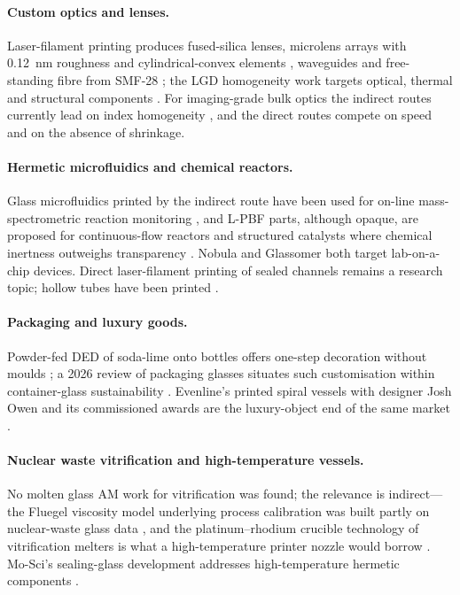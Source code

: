\paragraph{Custom optics and lenses.} Laser-filament printing produces fused-silica lenses, microlens arrays with \SI{0.12}{nm} roughness and cylindrical-convex elements \citep{kth2024microlens,luo2018quartz}, waveguides and free-standing fibre from SMF-28 \citep{hostetler2018sff}; the LGD homogeneity work targets optical, thermal and structural components \citep{lgd2024homog,grotesk2022}. For imaging-grade bulk optics the indirect routes currently lead on index homogeneity \citep{destino2018}, and the direct routes compete on speed and on the absence of shrinkage.

\paragraph{Hermetic microfluidics and chemical reactors.} Glass microfluidics printed by the indirect route have been used for on-line mass-spectrometric reaction monitoring \citep{microfluidics2019}, and L-PBF parts, although opaque, are proposed for continuous-flow reactors and structured catalysts where chemical inertness outweighs transparency \citep{datsiou2021}. Nobula and Glassomer both target lab-on-a-chip devices. Direct laser-filament printing of sealed channels remains a research topic; hollow tubes have been printed \citep{dgf2023tubes}.

\paragraph{Packaging and luxury goods.} Powder-fed DED of soda-lime onto bottles offers one-step decoration without moulds \citep{spirrett2023}; a 2026 review of packaging glasses situates such customisation within container-glass sustainability \citep{packaging2026}. Evenline's printed spiral vessels with designer Josh Owen and its commissioned awards are the luxury-object end of the same market \citep{threednatives2025}.

\paragraph{Nuclear waste vitrification and high-temperature vessels.} No molten glass AM work for vitrification was found; the relevance is indirect---the Fluegel viscosity model underlying process calibration was built partly on nuclear-waste glass data \citep{fluegel2007}, and the platinum--rhodium crucible technology of vitrification melters is what a high-temperature printer nozzle would borrow \citep{pgm2010}. Mo-Sci's sealing-glass development addresses high-temperature hermetic components \citep{mosci_web}.

